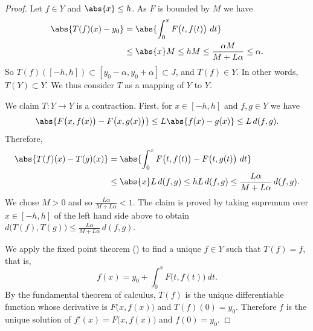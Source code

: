 \documentclass[12pt]{book}
\begin{document}
\begin{proof}
Let $f \in Y$ and $\abs{x} \leq h$.
As $F$ is bounded by $M$ we have
\begin{equation*}
\begin{split}
\abs{T(f)(x) - y_0}
&= \abs{\int_0^x F\bigl(t,f(t)\bigr)~dt} \\
& \leq 
\abs{x}M \leq hM \leq \frac{\alpha M}{M+ L\alpha} \leq \alpha .
\end{split}
\end{equation*}
So $T(f)([-h,h]) \subset [y_0-\alpha,y_0+\alpha] \subset J$, and
$T(f) \in Y$.
In other words, $T(Y) \subset Y$.
We thus consider
$T$ as a mapping of $Y$ to $Y$.

We claim $T \colon Y \to Y$ is a contraction.
First, for $x \in [-h,h]$
and $f,g \in Y$ we have
\begin{equation*}
\abs{F\bigl(x,f(x)\bigr) - F\bigl(x,g(x)\bigr)} \leq
L\abs{f(x)- g(x)} \leq L \, d(f,g) .
\end{equation*}
Therefore,
\begin{equation*}
\begin{split}
\abs{T(f)(x) - T(g)(x)}
&= \abs{\int_0^x F\bigl(t,f(t)\bigr) - F\bigl(t,g(t)\bigr)~dt} \\
& \leq \abs{x} L \, d(f,g)
 \leq h L\, d(f,g)
 \leq \frac{L\alpha}{M+L\alpha} \, d(f,g) .
\end{split}
\end{equation*}
We chose $M > 0$ and so
$\frac{L\alpha}{M+L\alpha} < 1$.
The claim is proved by
taking supremum over $x \in [-h,h]$ of the left hand side above to obtain
$d\bigl(T(f),T(g)\bigr) \leq \frac{L\alpha}{M+L\alpha} \, d(f,g)$.

We apply the fixed point theorem ()
to find a unique $f \in Y$ such that $T(f) = f$, that is,
\begin{equation*} %
f(x) = y_0 + \int_0^x F\bigl(t,f(t)\bigr)~dt .
\end{equation*}
By the fundamental theorem of calculus, $T(f)$ is the unique differentiable 
function whose derivative is
$F\bigl(x,f(x)\bigr)$ and $T(f)(0) = y_0$.
Therefore $f$ is the unique
solution of $f'(x) = F\bigl(x,f(x)\bigr)$ and $f(0) = y_0$.
\end{proof}

\end{document}
